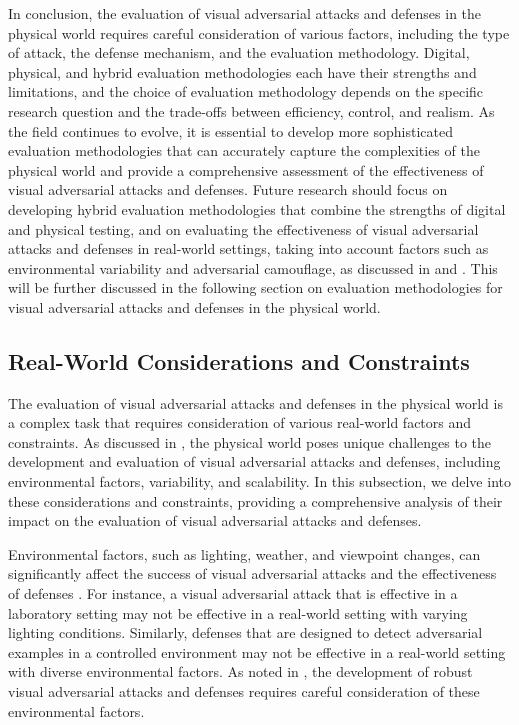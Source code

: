 \documentclass[11pt,a4paper]{article}
\begin{document}
In conclusion, the evaluation of visual adversarial attacks and defenses in the physical world requires careful consideration of various factors, including the type of attack, the defense mechanism, and the evaluation methodology. Digital, physical, and hybrid evaluation methodologies each have their strengths and limitations, and the choice of evaluation methodology depends on the specific research question and the trade-offs between efficiency, control, and realism. As the field continues to evolve, it is essential to develop more sophisticated evaluation methodologies that can accurately capture the complexities of the physical world and provide a comprehensive assessment of the effectiveness of visual adversarial attacks and defenses. Future research should focus on developing hybrid evaluation methodologies that combine the strengths of digital and physical testing, and on evaluating the effectiveness of visual adversarial attacks and defenses in real-world settings, taking into account factors such as environmental variability and adversarial camouflage, as discussed in \cite{arxiv:2203.03818} and \cite{doi:10.1109/access.2024.3446834}. This will be further discussed in the following section on evaluation methodologies for visual adversarial attacks and defenses in the physical world.


\subsection{Real-World Considerations and Constraints}


The evaluation of visual adversarial attacks and defenses in the physical world is a complex task that requires consideration of various real-world factors and constraints. As discussed in \cite{doi:10.24963/ijcai.2021/694}, the physical world poses unique challenges to the development and evaluation of visual adversarial attacks and defenses, including environmental factors, variability, and scalability. In this subsection, we delve into these considerations and constraints, providing a comprehensive analysis of their impact on the evaluation of visual adversarial attacks and defenses.

Environmental factors, such as lighting, weather, and viewpoint changes, can significantly affect the success of visual adversarial attacks and the effectiveness of defenses \cite{arxiv:1807.07769}. For instance, a visual adversarial attack that is effective in a laboratory setting may not be effective in a real-world setting with varying lighting conditions. Similarly, defenses that are designed to detect adversarial examples in a controlled environment may not be effective in a real-world setting with diverse environmental factors. As noted in \cite{arxiv:1707.08945}, the development of robust visual adversarial attacks and defenses requires careful consideration of these environmental factors.
\end{document}
